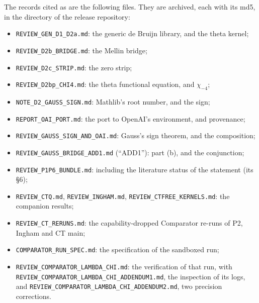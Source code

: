 \documentclass[11pt]{article}
\theoremstyle{definition}
\newcommand{\lean}[1]{\texttt{#1}}
\begin{document}
The records cited as \cite{bbrecords} are the following files. They are archived, each with its md5, in the  directory of the release repository:
\begin{itemize}\small
\item \lean{REVIEW\_\allowbreak{}GEN\_\allowbreak{}D1\_\allowbreak{}D2a.md}: the generic de Bruijn library, and the theta kernel;
\item \lean{REVIEW\_\allowbreak{}D2b\_\allowbreak{}BRIDGE.md}: the Mellin bridge;
\item \lean{REVIEW\_\allowbreak{}D2c\_\allowbreak{}STRIP.md}: the zero strip;
\item \lean{REVIEW\_\allowbreak{}D2bp\_\allowbreak{}CHI4.md}: the theta functional equation, and $\chi_{-4}$;
\item \lean{NOTE\_\allowbreak{}D2\_\allowbreak{}GAUSS\_\allowbreak{}SIGN.md}: Mathlib's root number, and the sign;
\item \lean{REPORT\_\allowbreak{}OAI\_\allowbreak{}PORT.md}: the port to OpenAI's environment, and provenance;
\item \lean{REVIEW\_\allowbreak{}GAUSS\_\allowbreak{}SIGN\_\allowbreak{}AND\_\allowbreak{}OAI.md}: Gauss's sign theorem, and the composition;
\item \lean{REVIEW\_\allowbreak{}GAUSS\_\allowbreak{}BRIDGE\_\allowbreak{}ADD1.md} (``ADD1''): part (b), and the conjunction;
\item \lean{REVIEW\_\allowbreak{}P1P6\_\allowbreak{}BUNDLE.md}: including the literature status of the statement (its \S6);
\item \lean{REVIEW\_\allowbreak{}CTQ.md}, \lean{REVIEW\_\allowbreak{}INGHAM.md}, \lean{REVIEW\_\allowbreak{}CTFREE\_\allowbreak{}KERNELS.md}: the companion results;
\item \lean{REVIEW\_\allowbreak{}CT\_\allowbreak{}RERUNS.md}: the capability-dropped Comparator re-runs of P2, Ingham and CT main;
\item \lean{COMPARATOR\_\allowbreak{}RUN\_\allowbreak{}SPEC.md}: the specification of the sandboxed run;
\item \lean{REVIEW\_\allowbreak{}COMPARATOR\_\allowbreak{}LAMBDA\_\allowbreak{}CHI.md}: the verification of that run, with \lean{REVIEW\_\allowbreak{}COMPARATOR\_\allowbreak{}LAMBDA\_\allowbreak{}CHI\_\allowbreak{}ADDENDUM1.md}, the inspection of its logs, and \lean{REVIEW\_\allowbreak{}COMPARATOR\_\allowbreak{}LAMBDA\_\allowbreak{}CHI\_\allowbreak{}ADDENDUM2.md}, two precision corrections.
\end{itemize}
\end{document}
